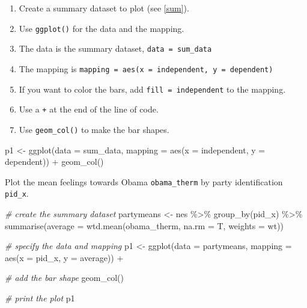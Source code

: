 \documentclass[
]{book}
\newenvironment{Shaded}{\begin{snugshade}}{\end{snugshade}}
\newcommand{\AttributeTok}[1]{\textcolor[rgb]{0.77,0.63,0.00}{#1}}
\newcommand{\CommentTok}[1]{\textcolor[rgb]{0.56,0.35,0.01}{\textit{#1}}}
\newcommand{\FunctionTok}[1]{\textcolor[rgb]{0.00,0.00,0.00}{#1}}
\newcommand{\NormalTok}[1]{#1}
\newcommand{\OtherTok}[1]{\textcolor[rgb]{0.56,0.35,0.01}{#1}}
\newcommand{\SpecialCharTok}[1]{\textcolor[rgb]{0.00,0.00,0.00}{#1}}
\providecommand{\tightlist}{%
  \setlength{\itemsep}{0pt}\setlength{\parskip}{0pt}}
\begin{document}
\begin{enumerate}
\def\labelenumi{\arabic{enumi}.}
\tightlist
\item
  Create a summary dataset to plot (see \ref{sum}).
\item
  Use \texttt{ggplot()} for the data and the mapping.
\item
  The data is the summary dataset, \texttt{data\ =\ sum\_data}
\item
  The mapping is \texttt{mapping\ =\ aes(x\ =\ independent,\ y\ =\ dependent)}
\item
  If you want to color the bars, add \texttt{fill\ =\ independent} to the mapping.
\item
  Use a \texttt{+} at the end of the line of code.
\item
  Use \texttt{geom\_col()} to make the bar shapes.
\end{enumerate}

\begin{Shaded}
\begin{Highlighting}[]
\NormalTok{p1 }\OtherTok{\textless{}{-}} \FunctionTok{ggplot}\NormalTok{(}\AttributeTok{data =}\NormalTok{ sum\_data, }
             \AttributeTok{mapping =} \FunctionTok{aes}\NormalTok{(}\AttributeTok{x =}\NormalTok{ independent, }\AttributeTok{y =}\NormalTok{ dependent)) }\SpecialCharTok{+}
  \FunctionTok{geom\_col}\NormalTok{()}
\end{Highlighting}
\end{Shaded}

Plot the mean feelings towards Obama \texttt{obama\_therm} by party identification \texttt{pid\_x}.

\begin{Shaded}
\begin{Highlighting}[]
\CommentTok{\# create the summary dataset}
\NormalTok{partymeans }\OtherTok{\textless{}{-}}\NormalTok{ nes }\SpecialCharTok{\%\textgreater{}\%}
  \FunctionTok{group\_by}\NormalTok{(pid\_x) }\SpecialCharTok{\%\textgreater{}\%}
  \FunctionTok{summarise}\NormalTok{(}\AttributeTok{average =} \FunctionTok{wtd.mean}\NormalTok{(obama\_therm, }\AttributeTok{na.rm =}\NormalTok{ T,}
                               \AttributeTok{weights =}\NormalTok{ wt))}

\CommentTok{\# specify the data and mapping}
\NormalTok{p1 }\OtherTok{\textless{}{-}} \FunctionTok{ggplot}\NormalTok{(}\AttributeTok{data =}\NormalTok{ partymeans,}
             \AttributeTok{mapping =} \FunctionTok{aes}\NormalTok{(}\AttributeTok{x =}\NormalTok{ pid\_x, }\AttributeTok{y =}\NormalTok{ average)) }\SpecialCharTok{+}
  
  \CommentTok{\# add the bar shape}
  \FunctionTok{geom\_col}\NormalTok{()}

\CommentTok{\# print the plot}
\NormalTok{p1}
\end{Highlighting}
\end{Shaded}
\end{document}
